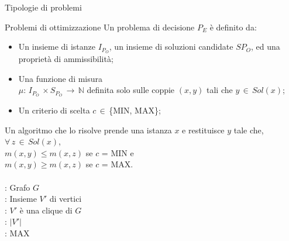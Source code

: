 \documentclass[10pt,a4paper]{article}
\begin{document}
\begin{multicols}{3}
\begin{textbox}{Tipologie di problemi}
\begin{textbox}{Problemi di ottimizzazione}
Un problema di decisione \(P_E\) è definito da:
\begin{itemize}[leftmargin=*]
    \item Un insieme di istanze \(I_{P_O}\), un insieme di soluzioni candidate  \(S{P_O}\), ed una proprietà di ammissibilità;
    \item Una funzione di misura \\\(\mu:\,I_{P_O}\,\times S_{P_O}\,\rightarrow\,\mathbb{N} \)
    definita solo sulle coppie \((x,y)\) tali che \(y\,\in\,Sol(x)\);
    \item Un criterio di scelta \(c\,\in\,\)\{MIN, MAX\};
\end{itemize}
Un algoritmo che lo risolve prende
una istanza \(x\) e restituisce \(y\) tale
che,\\ \(\forall\,z\,\in\,Sol(x)\), \\
\(m(x,y) \leq m(x,z)\) se \(c\) = MIN e \\
\(m(x,y) \geq m(x,z)\) se \(c\) = MAX.\\
\\
: Grafo \(G\)\\
: Insieme \(V'\) di vertici \\
: \(V'\) è una clique di \(G\)\\
: \(|V'|\) \\
: MAX
\end{textbox}

\end{textbox}








\end{multicols}
\end{document}
